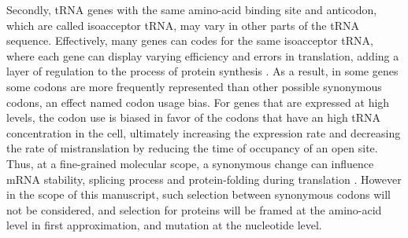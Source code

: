 Secondly, \acrshort{tRNA} genes with the same amino-acid binding site and anticodon, which are called isoacceptor \acrshort{tRNA}, may vary in other parts of the \acrshort{tRNA} sequence.
Effectively, many genes can codes for the same isoacceptor \acrshort{tRNA}, where each gene can display varying efficiency and errors in translation, adding a layer of regulation to the process of protein synthesis \citep{Lowe1997,Chan2008,Juhling2008,Lin2019}.
As a result, in some genes some \glspl{codon} are more frequently represented than other possible synonymous \glspl{codon}, an effect named \gls{codon} usage bias.
For genes that are expressed at high levels, the \gls{codon} use is biased in favor of the \glspl{codon} that have an high \acrshort{tRNA} concentration in the cell, ultimately increasing the expression rate and decreasing the rate of mistranslation by reducing the time of occupancy of an open site.
Thus, at a fine-grained molecular scope, a synonymous change can influence mRNA stability, splicing process and protein-folding during translation \citep{Plotkin2011, Rak2018}.
However in the scope of this manuscript, such selection between synonymous \glspl{codon} will not be considered, and selection for proteins will be framed at the amino-acid level in first approximation, and mutation at the nucleotide level.
